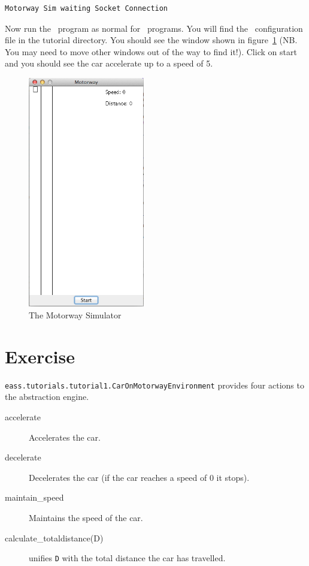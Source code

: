 \begin{verbatim}
Motorway Sim waiting Socket Connection
\end{verbatim}

Now run the \eass\ program as normal for \ail\ programs.  You will find the \ail\ configuration file in the tutorial directory.  You should see the window shown in figure~\ref{fig:motorwaysim} (NB.  You may need to move other windows out of the way to find it!).  Click on start and you should see the car accelerate up to a speed of 5.

\begin{figure}
\begin{center}
\includegraphics[width=2in]{images/EASSmotorwaysim.png}
\end{center}
\caption{The Motorway Simulator}
\label{fig:motorwaysim}
\end{figure}

\section{Exercise}

\texttt{eass.tutorials.tutorial1.CarOnMotorwayEnvironment} provides four actions to the abstraction engine.
\begin{description}
\item[accelerate] Accelerates the car.
\item[decelerate] Decelerates the car (if the car reaches a speed of 0 it stops).
\item[maintain\_speed] Maintains the speed of the car.
\item[calculate\_totaldistance(D)] unifies \texttt{D} with the total distance the car has travelled.
\end{description}

